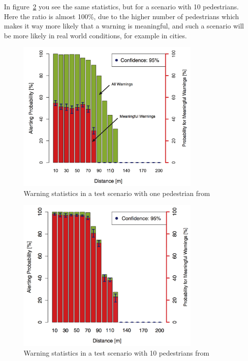 \documentclass[]{ccs-thesis}
\begin{document}
In figure~\ref{fig:chart2} you see the same statistics, but for a scenario with 10 pedestrians. Here the ratio is almost 100\%, due to the higher number of pedestrians which makes it way more likely that a warning is meaningful, and such a scenario will be more likely in real world conditions, for example in cities.

\begin{figure}[h]
	\centering
	\includegraphics[width=0.8\textwidth]{figures/2_chart}
	\caption{Warning statistics in a test scenario with one pedestrian from \cite{v2pprotection}}%
	\label{fig:chart1}%
\end{figure}

\begin{figure}[h]
	\centering
	\includegraphics[width=0.8\textwidth]{figures/3_chart}
	\caption{Warning statistics in a test scenario with 10 pedestrians from \cite{v2pprotection}}%
	\label{fig:chart2}%
\end{figure}
\end{document}
